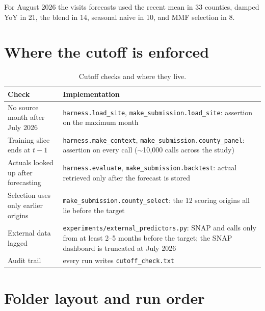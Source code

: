 \documentclass[11pt,letterpaper]{article}
\begin{document}
\noindent For August 2026 the visits forecasts used the recent mean in 33 counties, damped YoY in 21,
the blend in 14, seasonal naive in 10, and MMF selection in 8.

\section{Where the cutoff is enforced}

\begin{table}[H]\centering\small
\caption{Cutoff checks and where they live.}\label{tab:cutoff}
\begin{tabularx}{\textwidth}{L{5.2cm}X}
\toprule
Check & Implementation\\
\midrule
No source month after July 2026 & \texttt{harness.load\_site}, \texttt{make\_submission.load\_site}: assertion on the maximum month\\
Training slice ends at $t-1$ & \texttt{harness.make\_context}, \texttt{make\_submission.county\_panel}: assertion on every call ($\sim$10{,}000 calls across the study)\\
Actuals looked up after forecasting & \texttt{harness.evaluate}, \texttt{make\_submission.backtest}: actual retrieved only after the forecast is stored\\
Selection uses only earlier origins & \texttt{make\_submission.county\_select}: the 12 scoring origins all lie before the target\\
External data lagged & \texttt{experiments/external\_predictors.py}: SNAP and calls only from at least 2--5 months before the target; the SNAP dashboard is truncated at July 2026\\
Audit trail & every run writes \texttt{cutoff\_check.txt}\\
\bottomrule
\end{tabularx}
\end{table}

\section{Folder layout and run order}
\end{document}
